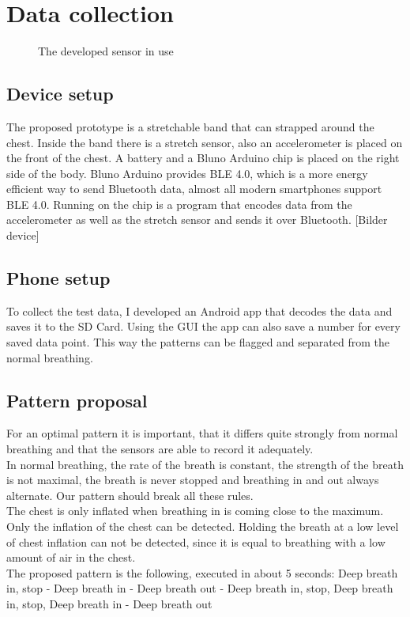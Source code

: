 \documentclass{article}
\begin{document}
\section{Data collection}
\begin{figure}[h]
  \centering
  \caption{The developed sensor in use}
\end{figure}
\label{sec: collection}
\subsection{Device setup}
The proposed prototype is a stretchable band that can strapped around the chest. Inside the band there is a stretch sensor, also an accelerometer is placed on the front of the chest. A battery and a Bluno Arduino chip is placed on the right side of the body. Bluno Arduino provides BLE 4.0, which is a more energy efficient way to send Bluetooth data, almost all modern smartphones support BLE 4.0. Running on the chip is a program that encodes data from the accelerometer as well as the stretch sensor and sends it over Bluetooth.
[Bilder device]
\subsection{Phone setup}
To collect the test data, I developed an Android app that decodes the data and saves it to the SD Card. Using the GUI the app can also save a number for every saved data point. This way the patterns can be flagged and separated from the normal breathing.
\subsection{Pattern proposal}
For an optimal pattern it is important, that it differs quite strongly from normal breathing and that the sensors are able to record it adequately. \\
In normal breathing, the rate of the breath is constant, the strength of the breath is not maximal, the breath is never stopped and breathing in and out always alternate. Our pattern should break all these rules. \\
The chest is only inflated when breathing in is coming close to the maximum. Only the inflation of the chest can be detected. Holding the breath at a low level of chest inflation can not be detected, since it is equal to breathing with a low amount of air in the chest. \\
The proposed pattern is the following, executed in about 5 seconds: Deep breath in, stop - Deep breath in - Deep breath out - Deep breath in, stop, Deep breath in, stop, Deep breath in - Deep breath out \\
\end{document}
